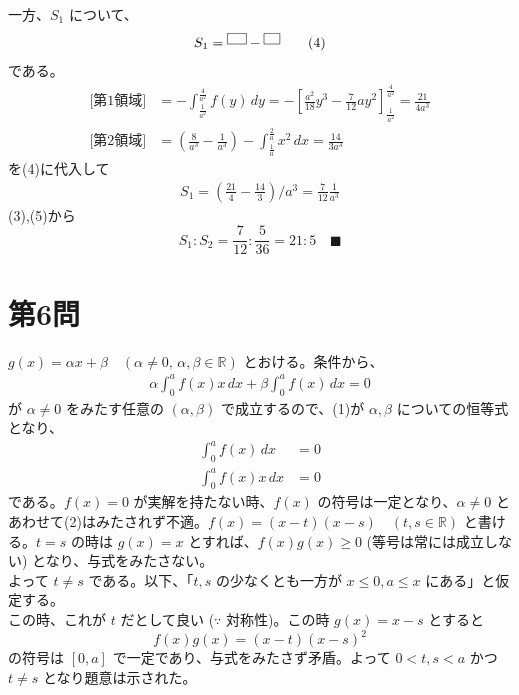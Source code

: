 \documentclass[../main.tex]{subfiles}
\begin{document}
一方、$S_1$ について、
\begin{align}
  S_1 =
  \begin{tikzpicture}[scale=0.4, baseline=-0.5ex]
    \draw (0,0) rectangle (1.2,0.7);
  \end{tikzpicture}
  -
  \begin{tikzpicture}[scale=0.4, baseline=-0.5ex]
    \draw (0,0) rectangle (1,0.7);
  \end{tikzpicture}
  \tag{4}
\end{align}
である。
\begin{align*}
  \text{[第1領域]} &= -\int_{\frac{1}{a^2}}^{\frac{4}{a^2}} f(y) \, dy = -\left[ \frac{a^2}{18}y^3 - \frac{7}{12}ay^2 \right]_{\frac{1}{a^2}}^{\frac{4}{a^2}} = \frac{21}{4a^3} \\
  \text{[第2領域]} &= \left( \frac{8}{a^3} - \frac{1}{a^3} \right) - \int_{\frac{1}{a}}^{\frac{2}{a}} x^2 \, dx = \frac{14}{3a^3}
\end{align*}
を(4)に代入して
\begin{align}
  S_1 = \left( \frac{21}{4} - \frac{14}{3} \right) / a^3 = \frac{7}{12}\frac{1}{a^3} \tag{5}
\end{align}
(3),(5)から
\[
  S_1 : S_2 = \frac{7}{12} : \frac{5}{36} = 21 : 5 \quad \text{■}
\]

\newpage

\section*{第6問}

\noindent
[\textbf{解}] $g(x) = \alpha x + \beta \quad (\alpha \ne 0, \, \alpha, \beta \in \mathbb{R})$ とおける。条件から、
\begin{align}
  \alpha \int_0^a f(x) x \, dx + \beta \int_0^a f(x) \, dx = 0 \tag{1}
\end{align}
が $\alpha \ne 0$ をみたす任意の $(\alpha, \beta)$ で成立するので、(1)が $\alpha, \beta$ についての恒等式となり、
\begin{align}
  \int_0^a f(x) \, dx &= 0 \tag{2} \\
  \int_0^a f(x) x \, dx &= 0 \tag{3}
\end{align}
である。$f(x) = 0$ が実解を持たない時、$f(x)$ の符号は一定となり、$\alpha \ne 0$ とあわせて(2)はみたされず不適。$f(x) = (x-t)(x-s) \quad (t, s \in \mathbb{R})$ と書ける。$t = s$ の時は $g(x) = x$ とすれば、$f(x)g(x) \ge 0$ (等号は常には成立しない) となり、与式をみたさない。\\
よって $t \ne s$ である。以下、「$t, s$ の少なくとも一方が $x \le 0, a \le x$ にある」と仮定する。\\
この時、これが $t$ だとして良い ($\because$ 対称性)。この時 $g(x) = x - s$ とすると
\[
  f(x)g(x) = (x-t)(x-s)^2
\]
の符号は $[0, a]$ で一定であり、与式をみたさず矛盾。よって $0 < t, s < a$ かつ $t \ne s$ となり題意は示された。 \quad {}
\end{document}
